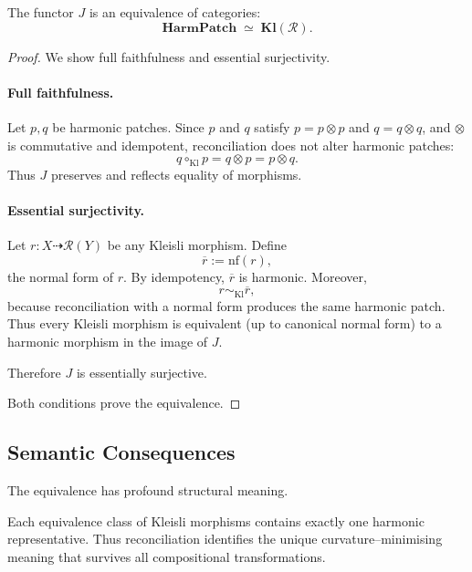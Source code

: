 \begin{theorem}
\label{thm:79-kleisli-equivalence}
The functor $J$ is an equivalence of categories:
\[
\mathbf{HarmPatch}
  \;\simeq\;
\mathbf{Kl}(\mathcal{R}).
\]
\end{theorem}

\begin{proof}
We show full faithfulness and essential surjectivity.

\paragraph{Full faithfulness.}
Let $p,q$ be harmonic patches.  
Since $p$ and $q$ satisfy $p = p\otimes p$ and $q = q\otimes q$, and
$\otimes$ is commutative and idempotent, reconciliation does not alter
harmonic patches:
\[
q \circ_{\mathrm{Kl}} p = q\otimes p = p\otimes q.
\]
Thus $J$ preserves and reflects equality of morphisms.

\paragraph{Essential surjectivity.}
Let $r : X \dasharrow \mathcal{R}(Y)$ be any Kleisli morphism.
Define
\[
\overline{r} := \mathrm{nf}(r),
\]
the normal form of $r$.  
By idempotency, $\overline{r}$ is harmonic.  
Moreover,
\[
r \sim_{\mathrm{Kl}} \overline{r},
\]
because reconciliation with a normal form produces the same harmonic patch.
Thus every Kleisli morphism is equivalent (up to canonical normal form)
to a harmonic morphism in the image of $J$.

Therefore $J$ is essentially surjective.

Both conditions prove the equivalence.
\end{proof}

\subsection{Semantic Consequences}
\label{subsec:79-6-consequences}

The equivalence has profound structural meaning.

\begin{corollary}
Each equivalence class of Kleisli morphisms contains exactly one harmonic
representative.  
Thus reconciliation identifies the unique curvature–minimising meaning
that survives all compositional transformations.
\end{corollary}

